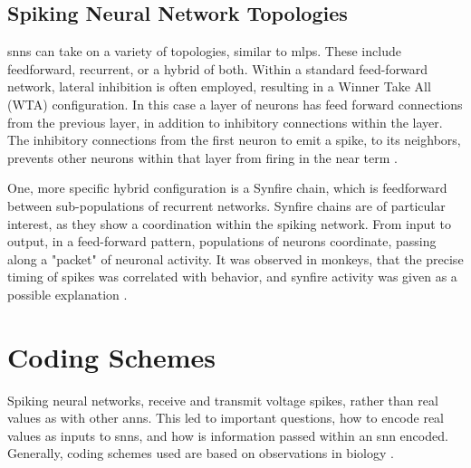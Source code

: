 
    
    \subsection{Spiking Neural Network Topologies}
    \glspl{snn} can take on a variety of topologies, similar to
    \glspl{mlp}. These include feedforward, recurrent, or a hybrid of
    both. Within a standard feed-forward network, lateral inhibition is often
    employed, resulting in a Winner Take All (WTA) configuration. In this case a
    layer of neurons has feed forward connections from the previous layer, in
    addition to inhibitory connections within the layer. The inhibitory
    connections from the first neuron to emit a spike, to its neighbors, prevents
    other neurons within that layer from firing in the near term
    \parencite{ponulak_2011}.
    
    One, more specific hybrid configuration is a Synfire chain, which is
    feedforward between sub-populations of recurrent networks. Synfire chains
    are of particular interest, as they show a coordination within the spiking
    network. From input to output, in a feed-forward pattern, populations of
    neurons coordinate, passing along a "packet" of neuronal activity. It was
    observed in monkeys, that the precise timing of spikes was correlated with
    behavior, and synfire activity was given as a possible explanation
    \parencite{aertsen_1996}.
    
    \section{Coding Schemes}
    Spiking neural networks, receive and transmit voltage spikes, rather than
    real values as with other \glspl{ann}. This led to important
    questions, how to encode real values as inputs to \glspl{snn}, and how is
    information passed within an \gls{snn} encoded. Generally, coding schemes
    used are based on observations in biology \parencite{ponulak_2011}.
    

